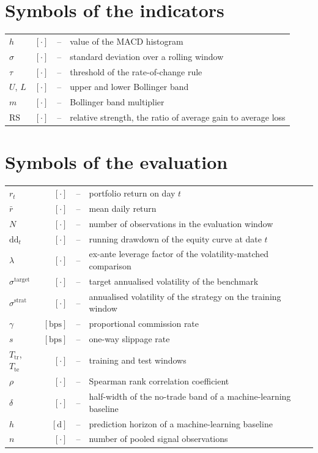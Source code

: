 \section*{Symbols of the indicators}
\noindent
\begin{tabular}{l r c l}
    $h$      & $[\cdot]$ &--& value of the MACD histogram \\
    $\sigma$ & $[\cdot]$ &--& standard deviation over a rolling window \\
    $\tau$   & $[\cdot]$ &--& threshold of the rate-of-change rule \\
    $U$, $L$ & $[\cdot]$ &--& upper and lower Bollinger band \\
    $m$      & $[\cdot]$ &--& Bollinger band multiplier \\
    $\mathrm{RS}$ & $[\cdot]$ &--& relative strength, the ratio of average gain to average loss \\
\end{tabular}

\section*{Symbols of the evaluation}
\noindent
\begin{tabular}{l r c l}
    $r_t$        & $[\cdot]$ &--& portfolio return on day $t$ \\
    $\bar{r}$    & $[\cdot]$ &--& mean daily return \\
    $N$          & $[\cdot]$ &--& number of observations in the evaluation window \\
    $\mathrm{dd}_t$ & $[\cdot]$ &--& running drawdown of the equity curve at date $t$ \\
    $\lambda$    & $[\cdot]$ &--& ex-ante leverage factor of the volatility-matched comparison \\
    $\sigma^{\text{target}}$ & $[\cdot]$ &--& target annualised volatility of the benchmark \\
    $\sigma^{\text{strat}}$  & $[\cdot]$ &--& annualised volatility of the strategy on the training window \\
    $\gamma$     & $[\text{bps}]$ &--& proportional commission rate \\
    $s$          & $[\text{bps}]$ &--& one-way slippage rate \\
    $T_\text{tr}$, $T_\text{te}$ & $[\cdot]$ &--& training and test windows \\
    $\rho$       & $[\cdot]$ &--& Spearman rank correlation coefficient \\
    $\delta$     & $[\cdot]$ &--& half-width of the no-trade band of a machine-learning baseline \\
    $h$          & $[\text{d}]$ &--& prediction horizon of a machine-learning baseline \\
    $n$          & $[\cdot]$ &--& number of pooled signal observations \\
\end{tabular}

